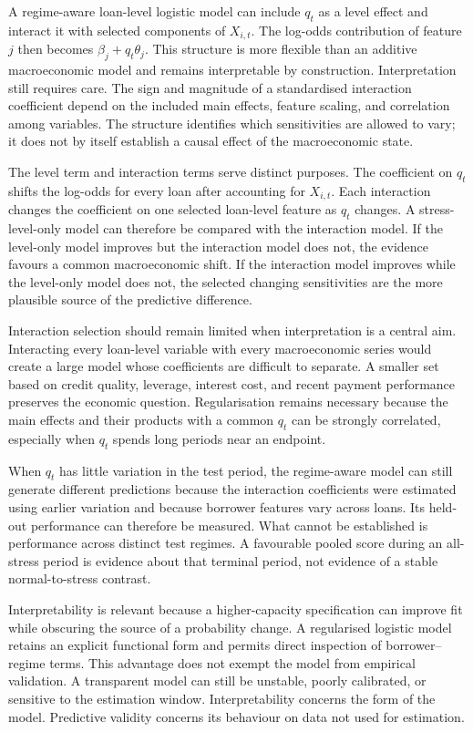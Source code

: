 A regime-aware loan-level logistic model can include $q_t$ as a level effect and interact it with selected components of $X_{i,t}$. The log-odds contribution of feature $j$ then becomes $\beta_j+q_t\theta_j$. This structure is more flexible than an additive macroeconomic model and remains interpretable by construction. Interpretation still requires care. The sign and magnitude of a standardised interaction coefficient depend on the included main effects, feature scaling, and correlation among variables. The structure identifies which sensitivities are allowed to vary; it does not by itself establish a causal effect of the macroeconomic state.

The level term and interaction terms serve distinct purposes. The coefficient on $q_t$ shifts the log-odds for every loan after accounting for $X_{i,t}$. Each interaction changes the coefficient on one selected loan-level feature as $q_t$ changes. A stress-level-only model can therefore be compared with the interaction model. If the level-only model improves but the interaction model does not, the evidence favours a common macroeconomic shift. If the interaction model improves while the level-only model does not, the selected changing sensitivities are the more plausible source of the predictive difference.

Interaction selection should remain limited when interpretation is a central aim. Interacting every loan-level variable with every macroeconomic series would create a large model whose coefficients are difficult to separate. A smaller set based on credit quality, leverage, interest cost, and recent payment performance preserves the economic question. Regularisation remains necessary because the main effects and their products with a common $q_t$ can be strongly correlated, especially when $q_t$ spends long periods near an endpoint.

When $q_t$ has little variation in the test period, the regime-aware model can still generate different predictions because the interaction coefficients were estimated using earlier variation and because borrower features vary across loans. Its held-out performance can therefore be measured. What cannot be established is performance across distinct test regimes. A favourable pooled score during an all-stress period is evidence about that terminal period, not evidence of a stable normal-to-stress contrast.

Interpretability is relevant because a higher-capacity specification can improve fit while obscuring the source of a probability change. A regularised logistic model retains an explicit functional form and permits direct inspection of borrower--regime terms. This advantage does not exempt the model from empirical validation. A transparent model can still be unstable, poorly calibrated, or sensitive to the estimation window. Interpretability concerns the form of the model. Predictive validity concerns its behaviour on data not used for estimation.

